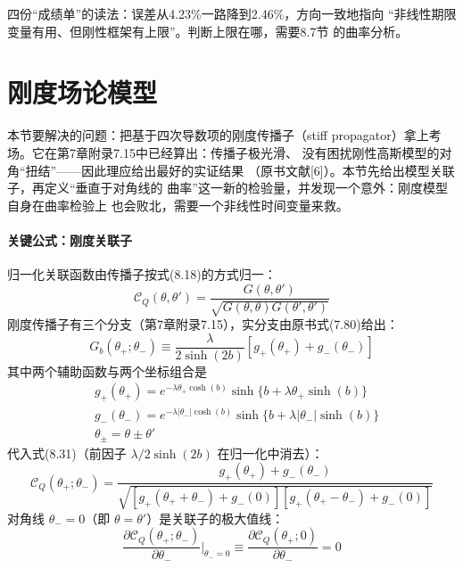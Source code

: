 四份“成绩单”的读法：误差从4.23\%一路降到2.46\%，方向一致地指向
“非线性期限变量有用、但刚性框架有上限”。判断上限在哪，需要8.7节
的曲率分析。

\section{刚度场论模型}

本节要解决的问题：把基于四次导数项的刚度传播子（stiff
propagator）拿上考场。它在第7章附录7.15中已经算出：传播子极光滑、
没有困扰刚性高斯模型的对角“扭结”——因此理应给出最好的实证结果
（原书文献[6]）。本节先给出模型关联子，再定义“垂直于对角线的
曲率”这一新的检验量，并发现一个意外：刚度模型自身在曲率检验上
也会败北，需要一个非线性时间变量来救。

\paragraph{关键公式：刚度关联子}
归一化关联函数由传播子按式(8.18)的方式归一：
\begin{equation*}
\mathcal{C}_{Q}(\theta,\theta')=
\frac{G(\theta,\theta')}{\sqrt{G(\theta,\theta)G(\theta',\theta')}}
\tag{8.31}
\end{equation*}
刚度传播子有三个分支（第7章附录7.15），实分支由原书式(7.80)给出：
\begin{equation*}
G_{b}(\theta_{+};\theta_{-})\equiv
\frac{\lambda}{2\sinh(2b)}\left[g_{+}(\theta_{+})+g_{-}(\theta_{-})\right]
\tag{8.32}
\end{equation*}
其中两个辅助函数与两个坐标组合是
\begin{align*}
&g_{+}(\theta_{+})=e^{-\lambda\theta_{+}\cosh(b)}
\sinh\{b+\lambda\theta_{+}\sinh(b)\}
\tag{8.33}\\
&g_{-}(\theta_{-})=e^{-\lambda|\theta_{-}|\cosh(b)}
\sinh\{b+\lambda|\theta_{-}|\sinh(b)\}
\tag{8.34}\\
&\theta_{\pm}=\theta\pm\theta'
\tag{8.35}
\end{align*}
代入式(8.31)（前因子 $\lambda/2\sinh(2b)$ 在归一化中消去）：
\begin{equation*}
\mathcal{C}_{Q}(\theta_{+};\theta_{-})=
\frac{g_{+}(\theta_{+})+g_{-}(\theta_{-})}
{\sqrt{\left[g_{+}(\theta_{+}+\theta_{-})+g_{-}(0)\right]
\left[g_{+}(\theta_{+}-\theta_{-})+g_{-}(0)\right]}}
\tag{8.36}
\end{equation*}
对角线 $\theta_{-}=0$（即 $\theta=\theta'$）是关联子的极大值线：
\begin{equation*}
\frac{\partial\mathcal{C}_{Q}(\theta_{+};\theta_{-})}{\partial\theta_{-}}
\bigg|_{\theta_{-}=0}
\equiv\frac{\partial\mathcal{C}_{Q}(\theta_{+};0)}{\partial\theta_{-}}=0
\tag{8.37}
\end{equation*}
